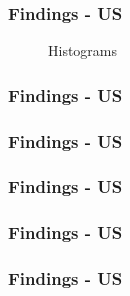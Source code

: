 \documentclass{beamer}
\begin{document}
\begin{frame}
\frametitle{Findings - US}
\begin{figure}[htbp]
	\centering
	
	\caption{Histograms}
\end{figure}

\end{frame}

\begin{frame}
\frametitle{Findings - US}
\begin{figure}[htbp]
	\centering
	
 	\caption{}
\end{figure}

\end{frame}


\begin{frame}
\frametitle{Findings - US}

\begin{table}[H]
	
 	\caption{}
\end{table}

\end{frame}



\begin{frame}
\frametitle{Findings - US}

\begin{figure}[htbp]
	\centering
	
	\caption{}
\end{figure}

\end{frame}

\begin{frame}
\frametitle{Findings - US}

\begin{figure}[htbp]
	\centering
	
	\caption{}
\end{figure}

\end{frame}

\begin{frame}
\frametitle{Findings - US}

\begin{figure}[htbp]
	\centering
	
	\caption{}
\end{figure}

\end{frame}
\end{document}
